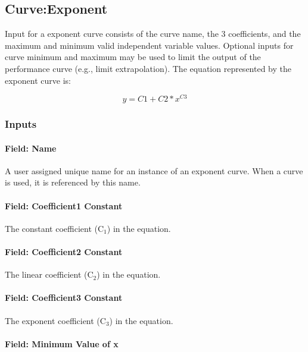 \subsection{Curve:Exponent}\label{curveexponent}

Input for a exponent curve consists of the curve name, the 3 coefficients, and the maximum and minimum valid independent variable values. Optional inputs for curve minimum and maximum may be used to limit the output of the performance curve (e.g., limit extrapolation). The equation represented by the exponent curve is:

\begin{equation}
y = C1 + C2*{x^{C3}}
\end{equation}

\subsubsection{Inputs}\label{inputs-5-019}

\paragraph{Field: Name}\label{field-name-5-015}

A user assigned unique name for an instance of an exponent curve. When a curve is used, it is referenced by this name.

\paragraph{Field: Coefficient1 Constant}\label{field-coefficient1-constant-5}

The constant coefficient (C\(_{1}\)) in the equation.

\paragraph{Field: Coefficient2 Constant}\label{field-coefficient2-constant}

The linear coefficient (C\(_{2}\)) in the equation.

\paragraph{Field: Coefficient3 Constant}\label{field-coefficient3-constant}

The exponent coefficient (C\(_{3}\)) in the equation.

\paragraph{Field: Minimum Value of x}\label{field-minimum-value-of-x-5}


